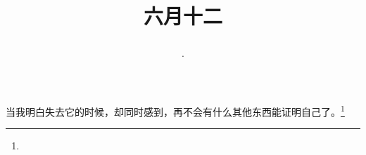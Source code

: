 \title{\date[d=17,m=7,y=2024][year:cn-y,年,month:cn,day:cn,日,·,weekday]·六月十二 }
当我明白失去它的时候，却同时感到，再不会有什么其他东西能证明自己了。\footnote{ }

